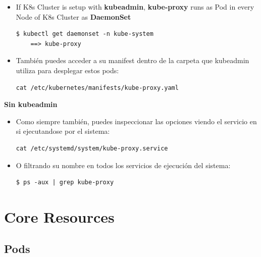 \documentclass{article}
\newenvironment{codetemplate}[1][]{%
  \mybasecolorbox[#1]
  \itshape
}{%
  \endmybasecolorbox
}
\begin{document}
\begin{itemize}
    \item If K8s Cluster is setup with \textbf{kubeadmin}, \textbf{kube-proxy} runs as Pod in every Node of K8s Cluster as \textbf{DaemonSet}
\begin{codetemplate}{}
\begin{verbatim}
$ kubectl get daemonset -n kube-system
    ==> kube-proxy
\end{verbatim}
\end{codetemplate}

    \item También puedes acceder a su manifest dentro de la carpeta que kubeadmin utiliza para desplegar estos pods:
\begin{codetemplate}{}
\begin{verbatim}
cat /etc/kubernetes/manifests/kube-proxy.yaml
\end{verbatim}
\end{codetemplate}
\end{itemize}

\textbf{Sin kubeadmin}

\begin{itemize}
    \item Como siempre también, puedes inspeccionar las opciones viendo el servicio en si ejecutandose por el sistema:
\begin{codetemplate}{}
\begin{verbatim}
cat /etc/systemd/system/kube-proxy.service
\end{verbatim}
\end{codetemplate}

    \item O filtrando su nombre en todos los servicios de ejecución del sistema:
\begin{codetemplate}{}
\begin{verbatim}
$ ps -aux | grep kube-proxy
\end{verbatim}
\end{codetemplate}
\end{itemize}

\newpage
\section{Core Resources}
\subsection{Pods}
\end{document}

